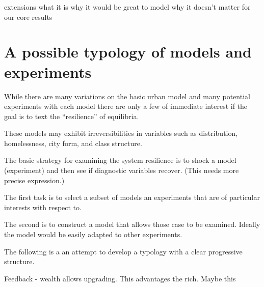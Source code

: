 extensions
what it is
why it would be great to model
why it doesn't matter for our core results

\section{A possible typology of models and experiments}
While there  are many variations on the basic urban model and many potential experiments with each model there are only a few of immediate interest if the goal is to text the ``resilience'' of equilibria.

These models may exhibit irreversibilities in variables such as distribution, homelessness, city form, and class structure. 

The basic strategy for examining the system resilience is to shock a model (experiment) and then see if diagnostic variables recover. (This needs more precise expression.)

The first task is to select a subset of models an experiments that are of particular interests with respect to.

The second is to construct a model that allows those case to be examined. Ideally the model would be easily adapted to other experiments.

The following is a an attempt to develop a typology with a clear progressive structure.

Feedback - wealth allows upgrading. This advantages the rich. Maybe this 

